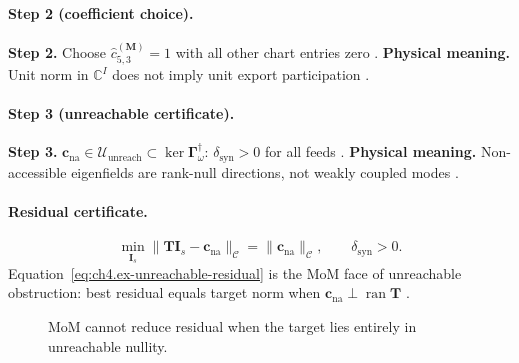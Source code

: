 \paragraph{Step 2 (coefficient choice).}
\textbf{Step 2.} Choose \(\widehat{c}_{5,3}^{(\mathbf{M})}=1\) with all other chart entries zero \cite{harrington2001,stratton1941,hansen1988}.
\textbf{Physical meaning.} Unit norm in \(\mathbb{C}^{I}\) does not imply unit export participation \cite{devaney2004,jackson1999}.

\paragraph{Step 3 (unreachable certificate).}
\textbf{Step 3.} \(\mathbf{c}_{\mathrm{na}}\in\mathcal{U}_{\mathrm{unreach}}\subset\ker\boldsymbol{\Gamma}_\omega^{\dagger}\): \(\delta_{\mathrm{syn}}>0\) for all feeds
\cite{devaney2004,stratton1941,harrington2001,hansen1988}.
\textbf{Physical meaning.} Non-accessible eigenfields are rank-null directions, not weakly coupled modes \cite{hansen1988,jackson1999}.

\paragraph{Residual certificate.}
\begin{equation}
\label{eq:ch4.ex-unreachable-residual}
\min_{\mathbf{I}_{s}}\|\mathbf{T}\mathbf{I}_{s}-\mathbf{c}_{\mathrm{na}}\|_{\mathcal{C}}
=
\|\mathbf{c}_{\mathrm{na}}\|_{\mathcal{C}},
\qquad
\delta_{\mathrm{syn}}>0.
\end{equation}
Equation~\eqref{eq:ch4.ex-unreachable-residual} is the MoM face of unreachable obstruction: best residual equals target norm when \(\mathbf{c}_{\mathrm{na}}\perp\operatorname{ran}\mathbf{T}\)
\cite{harrington2001,stratton1941,devaney2004,hansen1988}.

\begin{figure}[t]
\centering
{}
\caption{MoM cannot reduce residual when the target lies entirely in unreachable nullity.}
\label{fig:ch4.ex-unreachable-mom}
\end{figure}

